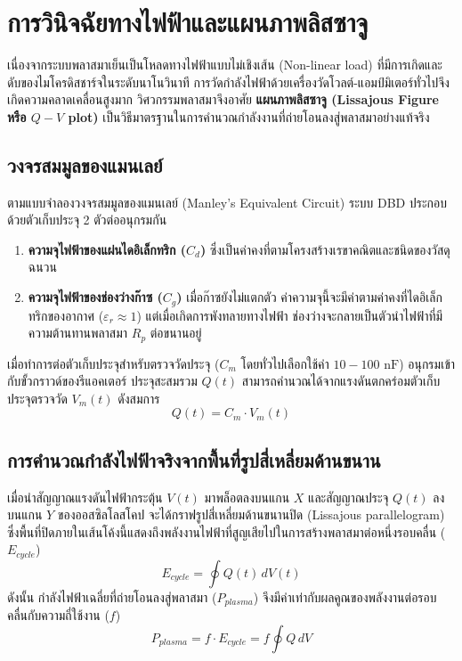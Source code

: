 \section{การวินิจฉัยทางไฟฟ้าและแผนภาพลิสซาจู}

เนื่องจากระบบพลาสมาเย็นเป็นโหลดทางไฟฟ้าแบบไม่เชิงเส้น (Non-linear load) ที่มีการเกิดและดับของไมโครดิสชาร์จในระดับนาโนวินาที การวัดกำลังไฟฟ้าด้วยเครื่องวัดโวลต์-แอมป์มิเตอร์ทั่วไปจึงเกิดความคลาดเคลื่อนสูงมาก วิศวกรรมพลาสมาจึงอาศัย \textbf{แผนภาพลิสซาจู (Lissajous Figure หรือ $Q-V$ plot)} เป็นวิธีมาตรฐานในการคำนวณกำลังงานที่ถ่ายโอนลงสู่พลาสมาอย่างแท้จริง

\subsection{วงจรสมมูลของแมนเลย์}

ตามแบบจำลองวงจรสมมูลของแมนเลย์ (Manley's Equivalent Circuit) ระบบ DBD ประกอบด้วยตัวเก็บประจุ 2 ตัวต่ออนุกรมกัน
\begin{enumerate}
    \item \textbf{ความจุไฟฟ้าของแผ่นไดอิเล็กทริก ($C_d$)} ซึ่งเป็นค่าคงที่ตามโครงสร้างเรขาคณิตและชนิดของวัสดุฉนวน
    \item \textbf{ความจุไฟฟ้าของช่องว่างก๊าซ ($C_g$)} เมื่อก๊าซยังไม่แตกตัว ค่าความจุนี้จะมีค่าตามค่าคงที่ไดอิเล็กทริกของอากาศ ($\varepsilon_r \approx 1$) แต่เมื่อเกิดการพังทลายทางไฟฟ้า ช่องว่างจะกลายเป็นตัวนำไฟฟ้าที่มีความต้านทานพลาสมา $R_p$ ต่อขนานอยู่
\end{enumerate}

เมื่อทำการต่อตัวเก็บประจุสำหรับตรวจวัดประจุ ($C_m$ โดยทั่วไปเลือกใช้ค่า $10 - 100\text{ nF}$) อนุกรมเข้ากับขั้วกราวด์ของรีแอคเตอร์ ประจุสะสมรวม $Q(t)$ สามารถคำนวณได้จากแรงดันตกคร่อมตัวเก็บประจุตรวจวัด $V_m(t)$ ดังสมการ
\begin{equation}
    Q(t) = C_m \cdot V_m(t)
\end{equation}

\subsection{การคำนวณกำลังไฟฟ้าจริงจากพื้นที่รูปสี่เหลี่ยมด้านขนาน}

เมื่อนำสัญญาณแรงดันไฟฟ้ากระตุ้น $V(t)$ มาพล็อตลงบนแกน $X$ และสัญญาณประจุ $Q(t)$ ลงบนแกน $Y$ ของออสซิลโลสโคป จะได้กราฟรูปสี่เหลี่ยมด้านขนานปิด (Lissajous parallelogram) ซึ่งพื้นที่ปิดภายในเส้นโค้งนี้แสดงถึงพลังงานไฟฟ้าที่สูญเสียไปในการสร้างพลาสมาต่อหนึ่งรอบคลื่น ($E_{cycle}$)
\begin{equation}
    E_{cycle} = \oint Q(t) \, dV(t)
    \label{eq:lissajous_energy}
\end{equation}
ดังนั้น กำลังไฟฟ้าเฉลี่ยที่ถ่ายโอนลงสู่พลาสมา ($P_{plasma}$) จึงมีค่าเท่ากับผลคูณของพลังงานต่อรอบคลื่นกับความถี่ใช้งาน ($f$)
\begin{equation}
    P_{plasma} = f \cdot E_{cycle} = f \oint Q \, dV
    \label{eq:lissajous_power}
\end{equation}

